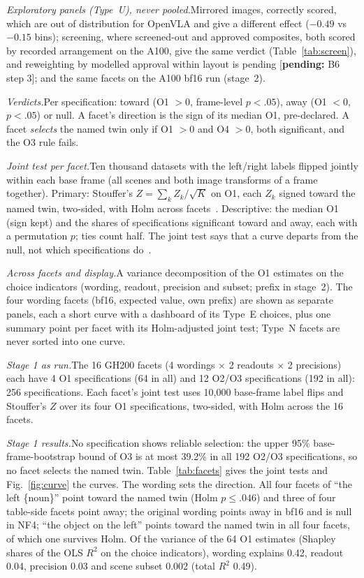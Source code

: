 \documentclass[conference]{IEEEtran}
\newcommand{\pending}[1]{\textcolor{orange!85!black}{[\textbf{pending:} #1]}}
\newcommand{\head}[1]{\textit{#1}\hspace{0.4em}}
\begin{document}
\head{Exploratory panels (Type~U), never pooled.}Mirrored images, correctly scored, which are out of distribution for OpenVLA and give a different effect ($-0.49$ vs $-0.15$ bins); screening, where screened-out and approved composites, both scored by recorded arrangement on the A100, give the same verdict (Table~\ref{tab:screen}), and reweighting by modelled approval within layout is pending \pending{B6 step 3}; and the same facets on the A100 bf16 run (stage~2).

\head{Verdicts.}Per specification: toward (O1 $>0$, frame-level $p<.05$), away (O1 $<0$, $p<.05$) or null. A facet's direction is the sign of its median O1, pre-declared. A facet \emph{selects} the named twin only if O1 $>0$ and O4 $>0$, both significant, and the O3 rule fails.

\head{Joint test per facet.}Ten thousand datasets with the left/right labels flipped jointly within each base frame (all scenes and both image transforms of a frame together). Primary: Stouffer's $Z=\sum_k Z_k/\sqrt{K}$ on O1, each $Z_k$ signed toward the named twin, two-sided, with Holm across facets~\cite{simonsohn2020specification}. Descriptive: the median O1 (sign kept) and the shares of specifications significant toward and away, each with a permutation $p$; ties count half. The joint test says that a curve departs from the null, not which specifications do~\cite{girardi2024post}.

\head{Across facets and display.}A variance decomposition of the O1 estimates on the choice indicators (wording, readout, precision and subset; prefix in stage~2). The four wording facets (bf16, expected value, own prefix) are shown as separate panels, each a short curve with a dashboard of its Type~E choices, plus one summary point per facet with its Holm-adjusted joint test; Type~N facets are never sorted into one curve.

\head{Stage 1 as run.}The 16 GH200 facets (4 wordings $\times$ 2 readouts $\times$ 2 precisions) each have 4 O1 specifications (64 in all) and 12 O2/O3 specifications (192 in all): 256 specifications. Each facet's joint test uses 10,000 base-frame label flips and Stouffer's $Z$ over its four O1 specifications, two-sided, with Holm across the 16 facets.

\head{Stage 1 results.}No specification shows reliable selection: the upper 95\% base-frame-bootstrap bound of O3 is at most 39.2\% in all 192 O2/O3 specifications, so no facet selects the named twin. Table~\ref{tab:facets} gives the joint tests and Fig.~\ref{fig:curve} the curves. The wording sets the direction. All four facets of ``the left \{noun\}'' point toward the named twin (Holm $p\leq.046$) and three of four table-side facets point away; the original wording points away in bf16 and is null in NF4; ``the object on the left'' points toward the named twin in all four facets, of which one survives Holm. Of the variance of the 64 O1 estimates (Shapley shares of the OLS $R^2$ on the choice indicators), wording explains 0.42, readout 0.04, precision 0.03 and scene subset 0.002 (total $R^2$ 0.49).
\end{document}
